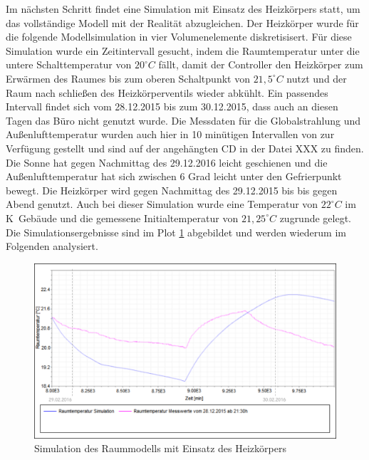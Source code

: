 Im nächsten Schritt findet eine Simulation mit Einsatz des Heizkörpers statt, um das vollständige Modell mit der Realität abzugleichen. Der Heizkörper wurde für die folgende Modellsimulation in vier Volumenelemente diskretisisert.
Für diese Simulation wurde ein Zeitintervall gesucht, indem die Raumtemperatur unter die untere Schalttemperatur von $20^{\circ}C$ fällt, damit der Controller den Heizkörper zum Erwärmen des Raumes bis zum oberen Schaltpunkt von $21,5^{\circ}C$ nutzt und der Raum nach schließen des Heizkörperventils wieder abkühlt. Ein passendes Intervall findet sich vom 28.12.2015 bis zum 30.12.2015, dass auch an diesen Tagen das Büro nicht genutzt wurde.
Die Messdaten für die Globalstrahlung und Außenlufttemperatur wurden auch hier in 10 minütigen Intervallen von \cite{wetter} zur Verfügung gestellt und sind auf der angehängten CD in der Datei XXX zu finden. Die Sonne hat gegen Nachmittag des 29.12.2016 leicht geschienen und die Außenlufttemperatur hat sich zwischen 6 Grad leicht unter den Gefrierpunkt bewegt. Die Heizkörper wird gegen Nachmittag des 29.12.2015 bis bis gegen Abend genutzt.
Auch bei dieser Simulation wurde eine Temperatur von $22^{\circ}C$ im K~Gebäude und die gemessene Initialtemperatur von $21,25^{\circ}C$ zugrunde gelegt. Die Simulationsergebnisse sind im Plot \ref{fig:valid2} abgebildet und werden wiederum im Folgenden analysiert.

\begin{figure}
\centering
\includegraphics[width=\textwidth]{abbildungen/20160328_validierung2}
\caption{Simulation des Raummodells mit Einsatz des Heizkörpers}
\label{fig:valid2}
\end{figure}

